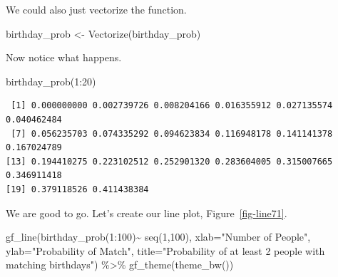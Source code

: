 \documentclass[
  letterpaper,
  DIV=11,
  numbers=noendperiod]{scrreprt}
\newenvironment{Shaded}{\begin{snugshade}}{\end{snugshade}}
\newcommand{\AttributeTok}[1]{\textcolor[rgb]{0.40,0.45,0.13}{#1}}
\newcommand{\DecValTok}[1]{\textcolor[rgb]{0.68,0.00,0.00}{#1}}
\newcommand{\FunctionTok}[1]{\textcolor[rgb]{0.28,0.35,0.67}{#1}}
\newcommand{\NormalTok}[1]{\textcolor[rgb]{0.00,0.23,0.31}{#1}}
\newcommand{\OtherTok}[1]{\textcolor[rgb]{0.00,0.23,0.31}{#1}}
\newcommand{\SpecialCharTok}[1]{\textcolor[rgb]{0.37,0.37,0.37}{#1}}
\newcommand{\StringTok}[1]{\textcolor[rgb]{0.13,0.47,0.30}{#1}}
\begin{document}
We could also just vectorize the function.

\begin{Shaded}
\begin{Highlighting}[]
\NormalTok{birthday\_prob }\OtherTok{\textless{}{-}} \FunctionTok{Vectorize}\NormalTok{(birthday\_prob)}
\end{Highlighting}
\end{Shaded}

Now notice what happens.

\begin{Shaded}
\begin{Highlighting}[]
\FunctionTok{birthday\_prob}\NormalTok{(}\DecValTok{1}\SpecialCharTok{:}\DecValTok{20}\NormalTok{)}
\end{Highlighting}
\end{Shaded}

\begin{verbatim}
 [1] 0.000000000 0.002739726 0.008204166 0.016355912 0.027135574 0.040462484
 [7] 0.056235703 0.074335292 0.094623834 0.116948178 0.141141378 0.167024789
[13] 0.194410275 0.223102512 0.252901320 0.283604005 0.315007665 0.346911418
[19] 0.379118526 0.411438384
\end{verbatim}

We are good to go. Let's create our line plot, Figure~\ref{fig-line71}.

\begin{Shaded}
\begin{Highlighting}[]
\FunctionTok{gf\_line}\NormalTok{(}\FunctionTok{birthday\_prob}\NormalTok{(}\DecValTok{1}\SpecialCharTok{:}\DecValTok{100}\NormalTok{)}\SpecialCharTok{\textasciitilde{}} \FunctionTok{seq}\NormalTok{(}\DecValTok{1}\NormalTok{,}\DecValTok{100}\NormalTok{),}
        \AttributeTok{xlab=}\StringTok{"Number of People"}\NormalTok{,}
        \AttributeTok{ylab=}\StringTok{"Probability of Match"}\NormalTok{,}
        \AttributeTok{title=}\StringTok{"Probability of at least 2 people with matching birthdays"}\NormalTok{) }\SpecialCharTok{\%\textgreater{}\%}
  \FunctionTok{gf\_theme}\NormalTok{(}\FunctionTok{theme\_bw}\NormalTok{())}
\end{Highlighting}
\end{Shaded}
\end{document}
